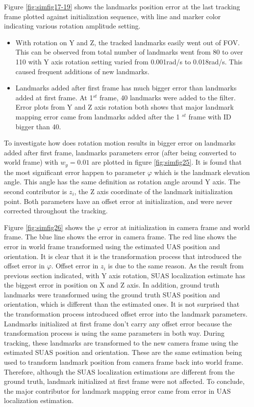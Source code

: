 Figure \ref{fig:simfig17-19} shows the landmarks position error at the last tracking frame plotted against initialization sequence, with line and marker color indicating various rotation amplitude setting.

\begin{itemize}
  \item With rotation on Y and Z, the tracked landmarks easily went out of FOV. This can be observed from total number of landmarks went from 80 to over 110 with Y axis rotation setting varied from 0.001rad/s to 0.018rad/s. This caused frequent additions of new landmarks.
  \item Landmarks added after first frame has much bigger error than landmarks added at first frame. At 1$^{st}$ frame, 40 landmarks were added to the filter. Error plots from Y and Z axis rotation both shows that major landmark mapping error came from landmarks added after the 1 $^{st}$ frame with ID bigger than 40.
\end{itemize}
\FloatBarrier

To investigate how does rotation motion results in bigger error on landmarks added after first frame, landmarks parameters error (after being converted to world frame) with $w_y = 0.01$ are plotted in figure \ref{fig:simfig25}. It is found that the most significant error happen to parameter $\varphi$ which is the landmark elevation angle. This angle has the same definition as rotation angle around Y axis. The second contributor is $z_i$, the Z axis coordinate of the landmark initialization point. Both parameters have an offset error at initialization, and were never corrected throughout the tracking.

Figure \ref{fig:simfig26} shows the $\varphi$ error at initialization in camera frame and world frame. The blue line shows the error in camera frame. The red line shows the error in world frame transformed using the estimated UAS position and orientation. It is clear that it is the transformation process that introduced the offset error in $\varphi$. Offset error in $z_i$ is due to the same reason. As the result from previous section indicated, with Y axis rotation, SUAS localization estimate has the biggest error in position on X and Z axis. In addition, ground truth landmarks were transformed using the ground truth SUAS position and orientation, which is different than the estimated ones. It is not surprised that the transformation process introduced offset error into the landmark parameters. Landmarks initialized at first frame don't carry any offset error because the transformation process is using the same parameters in both way. During tracking, these landmarks are transformed to the new camera frame using the estimated SUAS position and orientation. These are the same estimation being used to transform landmark position from camera frame back into world frame. Therefore, although the SUAS localization estimations are different from the ground truth, landmark initialized at first frame were not affected. To conclude, the major contributor for landmark mapping error came from error in UAS localization estimation.

